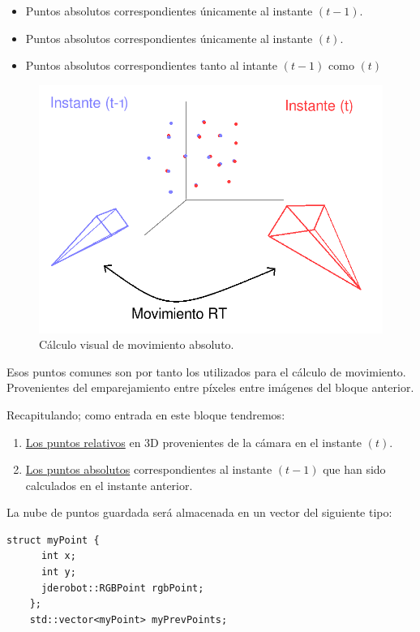 \begin{itemize}
\item Puntos absolutos correspondientes únicamente al instante $(t-1)$.
\item Puntos absolutos correspondientes únicamente al instante $(t)$.
\item Puntos absolutos correspondientes tanto al intante $(t-1)$ como $(t)$
\end{itemize}

\begin{figure}[th]
\centering
\includegraphics[scale=0.4]{Figures/movement-rt.png}
\decoRule
\caption[movement-rt]{Cálculo visual de movimiento absoluto.}
\label{fig:movementRt}
\end{figure}

Esos puntos comunes son por tanto los utilizados para el cálculo de movimiento. Provenientes del emparejamiento entre píxeles entre imágenes del bloque anterior.

Recapitulando; como entrada en este bloque tendremos:

\begin{enumerate}
\item \underline{Los puntos relativos} en 3D provenientes de la cámara en el instante $(t)$.
\item \underline{Los puntos absolutos} correspondientes al instante $(t-1)$ que han sido calculados en el instante anterior.
\end{enumerate}

La nube de puntos guardada será almacenada en un vector del siguiente tipo:

\begin{lstlisting}[style=CStyle]
    struct myPoint {
      int x;
      int y;
      jderobot::RGBPoint rgbPoint;
    };
    std::vector<myPoint> myPrevPoints;
\end{lstlisting}


